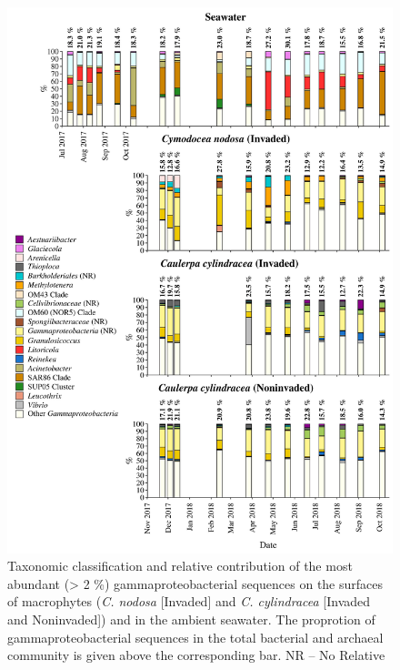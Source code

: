\documentclass[12pt,]{article}
\begin{document}
\begin{figure}[H]

{\centering \includegraphics[width=0.85\linewidth]{../results/figures/gammaproteobacteria_bar_plot} 

}

\caption{Taxonomic classification and relative contribution of the most abundant (> 2 \si{\percent}) gammaproteobacterial sequences on the surfaces of macrophytes (\textit{C. nodosa} [Invaded] and \textit{C. cylindracea} [Invaded and Noninvaded]) and in the ambient seawater. The proprotion of gammaproteobacterial sequences in the total bacterial and archaeal community is given above the corresponding bar. NR -- No Relative\label{gamma}}\label{fig:unnamed-chunk-8}
\end{figure}
\end{document}
